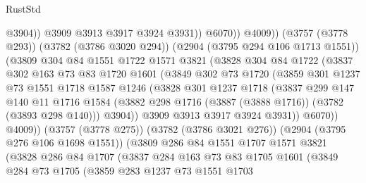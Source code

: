 \begin{lexlean}{RustStd}
\begin{coremodule}
                              @3904))
                          @3909
                          @3913
                          @3917
                          @3924
                          @3931))
                      @6070))
                  @4009))
              (@3757 (@3778 @293))
              (@3782 (@3786 @3020 @294))
              (@2904 (@3795 @294 @106 @1713 @1551))
              (@3809
                @304
                @84
                @1551
                @1722
                @1571
                @3821
                (@3828
                  @304
                  @84
                  @1722
                  (@3837
                    @302
                    @163
                    @73
                    @83
                    @1720
                    @1601
                    (@3849
                      @302
                      @73
                      @1720
                      (@3859
                        @301
                        @1237
                        @73
                        @1551
                        @1718
                        @1587
                        @1246
                        (@3828
                          @301
                          @1237
                          @1718
                          (@3837
                            @299
                            @147
                            @140
                            @11
                            @1716
                            @1584
                            (@3882 @298 @1716 (@3887 (@3888 @1716)) (@3782 (@3893 @298 @140)))
                            @3904))
                        @3909
                        @3913
                        @3917
                        @3924
                        @3931))
                    @6070))
                @4009))
            (@3757 (@3778 @275))
            (@3782 (@3786 @3021 @276))
            (@2904 (@3795 @276 @106 @1698 @1551))
            (@3809
              @286
              @84
              @1551
              @1707
              @1571
              @3821
              (@3828
                @286
                @84
                @1707
                (@3837
                  @284
                  @163
                  @73
                  @83
                  @1705
                  @1601
                  (@3849
                    @284
                    @73
                    @1705
                    (@3859
                      @283
                      @1237
                      @73
                      @1551
                      @1703

\end{coremodule}
\end{lexlean}
